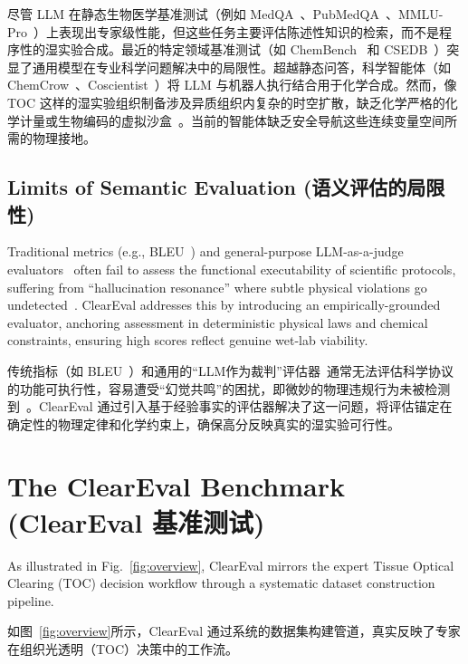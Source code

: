 \documentclass[runningheads]{llncs}
\begin{document}
尽管 LLM 在静态生物医学基准测试（例如 MedQA~\cite{jin2021disease}、PubMedQA~\cite{jin2019pubmedqa}、MMLU-Pro~\cite{wang2024mmlupro}）上表现出专家级性能，但这些任务主要评估陈述性知识的检索，而不是程序性的湿实验合成。最近的特定领域基准测试（如 ChemBench~\cite{mirza2025chembench} 和 CSEDB~\cite{wang2025csedb}）突显了通用模型在专业科学问题解决中的局限性。超越静态问答，科学智能体（如 ChemCrow~\cite{bran2024chemcrow}、Coscientist~\cite{boiko2024autonomous}）将 LLM 与机器人执行结合用于化学合成。然而，像 TOC 这样的湿实验组织制备涉及异质组织内复杂的时空扩散，缺乏化学严格的化学计量或生物编码的虚拟沙盒~\cite{odonoghue2023bioplanner}。当前的智能体缺乏安全导航这些连续变量空间所需的物理接地。

\subsection{Limits of Semantic Evaluation (语义评估的局限性)}

Traditional metrics (e.g., BLEU~\cite{papineni2002bleu}) and general-purpose LLM-as-a-judge evaluators~\cite{liu2023geval} often fail to assess the functional executability of scientific protocols, suffering from ``hallucination resonance'' where subtle physical violations go undetected~\cite{bang2025hallulens}. ClearEval addresses this by introducing an empirically-grounded evaluator, anchoring assessment in deterministic physical laws and chemical constraints, ensuring high scores reflect genuine wet-lab viability.

传统指标（如 BLEU~\cite{papineni2002bleu}）和通用的“LLM作为裁判”评估器~\cite{liu2023geval}通常无法评估科学协议的功能可执行性，容易遭受“幻觉共鸣”的困扰，即微妙的物理违规行为未被检测到~\cite{bang2025hallulens}。ClearEval 通过引入基于经验事实的评估器解决了这一问题，将评估锚定在确定性的物理定律和化学约束上，确保高分反映真实的湿实验可行性。

\section{The ClearEval Benchmark (ClearEval 基准测试)}

As illustrated in Fig.~\ref{fig:overview}, ClearEval mirrors the expert Tissue Optical Clearing (TOC) decision workflow through a systematic dataset construction pipeline.

如图~\ref{fig:overview}所示，ClearEval 通过系统的数据集构建管道，真实反映了专家在组织光透明（TOC）决策中的工作流。
\end{document}
